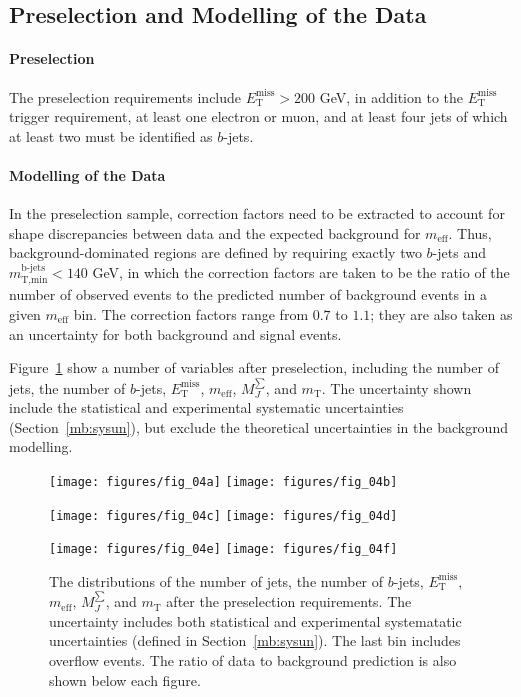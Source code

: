 \subsection{Preselection and Modelling of the Data}\label{mb:pres}

\paragraph{Preselection} The preselection requirements include
$E_{\text{T}}^{\text{miss}} > 200$ GeV, in addition to the
$E_{\text{T}}^{\text{miss}}$ trigger requirement, at least one electron or
muon, and at least four jets of which at least two must be identified as
$b$-jets.

\paragraph{Modelling of the Data} In the preselection sample, correction
factors need to be extracted to account for shape discrepancies between data
and the expected background for $m_{\text{eff}}$. Thus, background-dominated
regions are defined by requiring exactly two $b$-jets and
$m_{\text{T,min}}^{\text{b-jets}} < 140$ GeV, in which the correction factors
are taken to be the ratio of the number of observed events to the predicted
number of background events in a given $m_{\text{eff}}$ bin. The correction
factors range from $0.7$ to $1.1$; they are also taken as an uncertainty for
both background and signal events.

Figure~\ref{f:fig_04abcdef} show a number of variables after preselection,
including the number of jets, the number of $b$-jets,
$E_{\text{T}}^{\text{miss}}$, $m_{\text{eff}}$, $M_J^{\sum}$, and
$m_{\text{T}}$. The uncertainty shown include the statistical and experimental
systematic uncertainties (Section~\ref{mb:sysun}), but exclude the theoretical
uncertainties in the background modelling.

\begin{center}

	\begin{figure}[H]
		\texttt{[image: figures/fig\_04a]}
		\texttt{[image: figures/fig\_04b]}

		\texttt{[image: figures/fig\_04c]}
		\texttt{[image: figures/fig\_04d]}


		\texttt{[image: figures/fig\_04e]}
		\texttt{[image: figures/fig\_04f]}

		\caption{The distributions of the number of jets, the number of $b$-jets,
		$E_{\text{T}}^{\text{miss}}$, $m_{\text{eff}}$, $M_J^{\sum}$, and
		$m_{\text{T}}$ after the preselection requirements. The uncertainty
		includes both statistical and experimental systematatic uncertainties
		(defined in Section~\ref{mb:sysun}). The last bin includes overflow events.
		The ratio of data to background prediction is also shown below each
		figure.}

		\label{f:fig_04abcdef}

	\end{figure}

\end{center}

